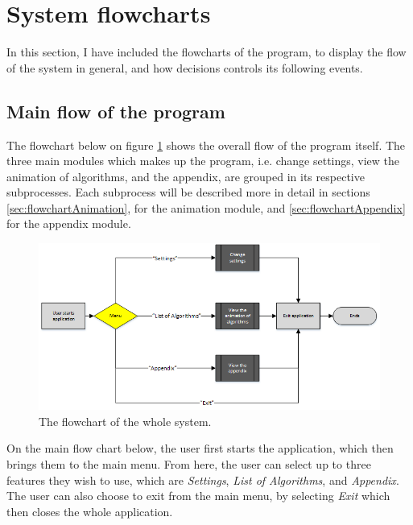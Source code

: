 \newpage

\section{System flowcharts}
In this section, I have included the flowcharts of the program, to display the flow of the system in general, and how decisions controls its following events. 

\subsection{Main flow of the program}
The flowchart below on figure \ref{mainFlowChart} shows the overall flow of the program itself. The three main modules which makes up the program, i.e. change settings, view the animation of algorithms, and the appendix, are grouped in its respective subprocesses. Each subprocess will be described more in detail in sections \ref{sec:flowchartAnimation}, for the animation module, and \ref{sec:flowchartAppendix} for the appendix module.

\begin{figure}[H]
\centering
\hspace*{-1cm}
\includegraphics[scale=1]{images/report_images/flowchartMain.png}
\caption{The flowchart of the whole system.}
\label{mainFlowChart}
\end{figure}

On the main flow chart below, the user first starts the application, which then brings them to the main menu. From here, the user can select up to three features they wish to use, which are \textit{Settings}, \textit{List of Algorithms}, and \textit{Appendix}. The user can also choose to exit from the main menu, by selecting \textit{Exit} which then closes the whole application.

